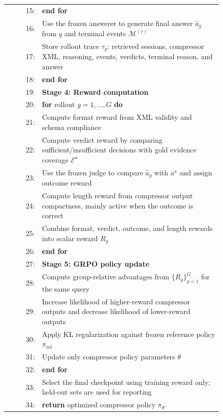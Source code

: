 \begin{tcolorbox}
\begin{tabular}{@{}r@{\quad}p{0.84\linewidth}@{}}
15: & \hspace*{3em}\textbf{end for} \\
16: & \hspace*{3em}Use the frozen answerer to generate final answer $\hat{a}_g$ from $q$ and terminal events $\mathcal{M}^{(r)}$ \\
17: & \hspace*{3em}Store rollout trace $\tau_g$: retrieved sessions, compressor XML, reasoning, events, verdicts, terminal reason, and answer \\
18: & \hspace*{2em}\textbf{end for} \\
19: & \hspace*{1em}\textbf{Stage 4: Reward computation} \\
20: & \hspace*{2em}\textbf{for} rollout $g=1,\ldots,G$ \textbf{do} \\
21: & \hspace*{3em}Compute format reward from XML validity and schema compliance \\
22: & \hspace*{3em}Compute verdict reward by comparing sufficient/insufficient decisions with gold evidence coverage $\mathcal{E}^\star$ \\
23: & \hspace*{3em}Use the frozen judge to compare $\hat{a}_g$ with $a^\star$ and assign outcome reward \\
24: & \hspace*{3em}Compute length reward from compressor output compactness, mainly active when the outcome is correct \\
25: & \hspace*{3em}Combine format, verdict, outcome, and length rewards into scalar reward $R_g$ \\
26: & \hspace*{2em}\textbf{end for} \\
27: & \hspace*{1em}\textbf{Stage 5: GRPO policy update} \\
28: & \hspace*{2em}Compute group-relative advantages from $\{R_g\}_{g=1}^{G}$ for the same query \\
29: & \hspace*{2em}Increase likelihood of higher-reward compressor outputs and decrease likelihood of lower-reward outputs \\
30: & \hspace*{2em}Apply KL regularization against frozen reference policy $\pi_{\mathrm{ref}}$ \\
31: & \hspace*{2em}Update only compressor policy parameters $\theta$ \\
32: & \textbf{end for} \\
33: & Select the final checkpoint using training reward only; held-out sets are used for reporting \\
34: & \textbf{return} optimized compressor policy $\pi_{\theta'}$
\end{tabular}
\end{tcolorbox}

